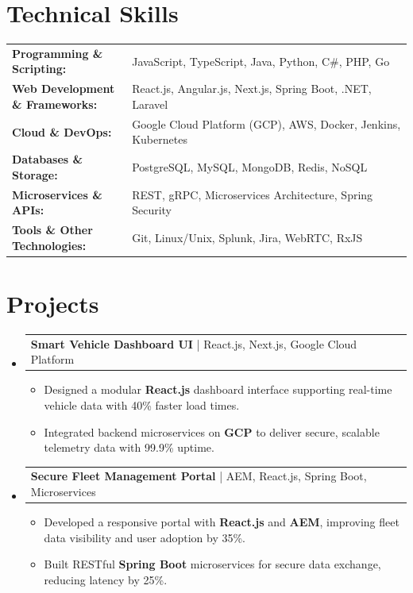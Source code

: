 \documentclass[letterpaper,10pt]{article}
\makeatletter
\newcommand{\resumeItem}[1]{
  \item{\fontsize{8pt}{9pt}\selectfont
    #1 \vspace{-3pt}
  }
}
\newcommand{\resumeProjectHeading}[2]{
    \item
    \begin{tabular*}{1.001\textwidth}{l@{\extracolsep{\fill}}r}
      \fontsize{8.5pt}{10pt}#1 & \textbf{\fontsize{8.5pt}{10pt} #2}\\
    \end{tabular*}\vspace{-7pt}
}
\newcommand{\resumeSubHeadingListStart}{\begin{itemize}[leftmargin=0pt, label={}]}
\newcommand{\resumeSubHeadingListEnd}{\end{itemize}}
\newcommand{\resumeItemListStart}{\begin{itemize}[leftmargin=*]}
\newcommand{\resumeItemListEnd}{\end{itemize}\vspace{-5pt}}
\makeatother
\begin{document}
\section{Technical Skills}
        \vspace{-14pt}
        \begin{table}[h]
            \fontsize{8pt}{9pt}\selectfont
            \begin{tabular}{p{0.3\linewidth} p{0.7\linewidth}}
                \textbf{Programming \& Scripting:} & JavaScript, TypeScript, Java, Python, C\#, PHP, Go \\
                \textbf{Web Development \& Frameworks:} & React.js, Angular.js, Next.js, Spring Boot, .NET, Laravel \\
                \textbf{Cloud \& DevOps:} & Google Cloud Platform (GCP), AWS, Docker, Jenkins, Kubernetes \\
                \textbf{Databases \& Storage:} & PostgreSQL, MySQL, MongoDB, Redis, NoSQL \\
                \textbf{Microservices \& APIs:} & REST, gRPC, Microservices Architecture, Spring Security \\
                \textbf{Tools \& Other Technologies:} & Git, Linux/Unix, Splunk, Jira, WebRTC, RxJS \\
            \end{tabular}
        \end{table}
 \vspace{-18pt}

\section{Projects}
    \vspace{-5pt}
    \resumeSubHeadingListStart
          \resumeProjectHeading
            {\textbf{Smart Vehicle Dashboard UI} | React.js, Next.js, Google Cloud Platform}
            {}
            \resumeItemListStart
                \resumeItem{Designed a modular \textbf{React.js} dashboard interface supporting real-time vehicle data with 40\% faster load times.}
                \resumeItem{Integrated backend microservices on \textbf{GCP} to deliver secure, scalable telemetry data with 99.9\% uptime.}
            \resumeItemListEnd
        \vspace{-12pt}
    
        \resumeProjectHeading
            {\textbf{Secure Fleet Management Portal} | AEM, React.js, Spring Boot, Microservices}
            {}
            \resumeItemListStart
                \resumeItem{Developed a responsive portal with \textbf{React.js} and \textbf{AEM}, improving fleet data visibility and user adoption by 35\%.}
                \resumeItem{Built RESTful \textbf{Spring Boot} microservices for secure data exchange, reducing latency by 25\%.}
            \resumeItemListEnd
    \resumeSubHeadingListEnd
\end{document}
